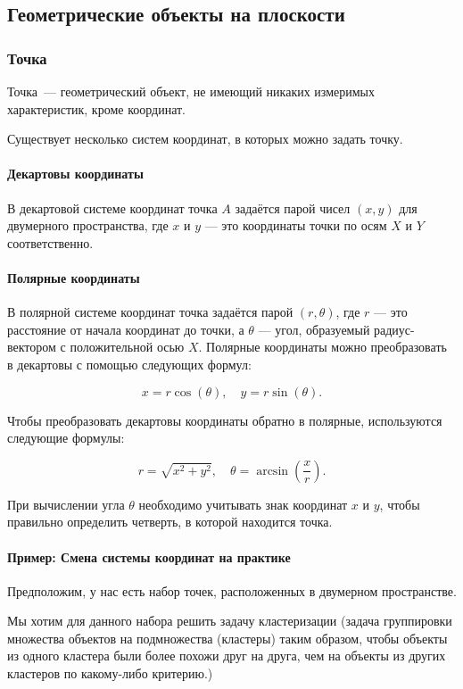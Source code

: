 
\subsection{Геометрические объекты на плоскости}

\subsubsection{Точка}
Точка~--- геометрический объект, не имеющий никаких измеримых характеристик, кроме координат.

Существует несколько систем координат, в которых можно задать точку.

\paragraph{Декартовы координаты}
В декартовой системе координат точка $A$ задаётся парой чисел $(x, y)$ для двумерного пространства, где $x$ и $y$ — это координаты точки по осям $X$ и $Y$ соответственно.

\paragraph{Полярные координаты}
В полярной системе координат точка задаётся парой $(r, \theta)$, где $r$ — это расстояние от начала координат до точки, а $\theta$ — угол, образуемый радиус-вектором с положительной осью $X$. Полярные координаты можно преобразовать в декартовы с помощью следующих формул:

\[
    x = r \cos(\theta), \quad y = r \sin(\theta).
\]

Чтобы преобразовать декартовы координаты обратно в полярные, используются следующие формулы:

\[
    r = \sqrt{x^2 + y^2}, \quad \theta = \arcsin\left(\frac{x}{r}\right).
\]

При вычислении угла $\theta$ необходимо учитывать знак координат $x$ и $y$, чтобы правильно определить четверть, в которой находится точка.

\paragraph*{Пример: Смена системы координат на практике}

Предположим, у нас есть набор точек, расположенных в двумерном пространстве. \newline
\par Мы хотим для данного набора решить задачу кластеризации (задача группировки множества объектов на подмножества (кластеры) таким образом, чтобы объекты из одного кластера были более похожи друг на друга, чем на объекты из других кластеров по какому-либо критерию.)


